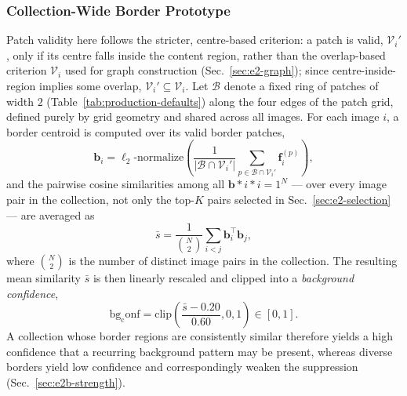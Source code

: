 \subsubsection{Collection-Wide Border Prototype}
\label{sec:e2b-prototype}

Patch validity here follows the stricter, centre-based criterion: a patch is valid, $\mathcal{V}_i' $, only if its centre falls inside the content region, rather than the overlap-based criterion $\mathcal{V}_i$ used for graph construction (Sec.~\ref{sec:e2-graph}); since centre-inside-region implies some overlap, $\mathcal{V}_i' \subseteq \mathcal{V}_i$. Let $\mathcal{B}$ denote a fixed ring of patches of width $2$ (Table~\ref{tab:production-defaults}) along the four edges of the patch grid, defined purely by grid geometry and shared across all images. For each image $i$, a border centroid is computed over its valid border patches,
\begin{equation}
    \mathbf{b}_i = \ell_2\text{-normalize}
    \left(\frac{1}{|\mathcal{B}\cap\mathcal{V}_i'|}
    \sum_{p \in \mathcal{B}\cap\mathcal{V}_i'} \mathbf{f}_i^{(p)}\right),
    \label{eq:e2b-centroid}
\end{equation}
and the pairwise cosine similarities among all ${\mathbf{b}*i}*{i=1}^N$ --- over every image pair in the collection, not only the top-$K$ pairs selected in Sec.~\ref{sec:e2-selection} --- are averaged as
\begin{equation}
\bar{s}
=
\frac{1}{\binom{N}{2}}
\sum_{i<j}
\mathbf{b}_i^\top \mathbf{b}_j,
\label{eq:e2b-border-similarity}
\end{equation}
where $\binom{N}{2}$ is the number of distinct image pairs in the collection. The resulting mean similarity $\bar{s}$ is then linearly rescaled and clipped into a \emph{background confidence},
\begin{equation}
\mathrm{bg_conf}
=
\mathrm{clip}
\left(
\frac{\bar{s}-0.20}{0.60},
0,
1
\right)
\in [0,1].
\end{equation}
A collection whose border regions are consistently similar therefore yields a high confidence that a recurring background pattern may be present, whereas diverse borders yield low confidence and correspondingly weaken the suppression (Sec.~\ref{sec:e2b-strength}).

